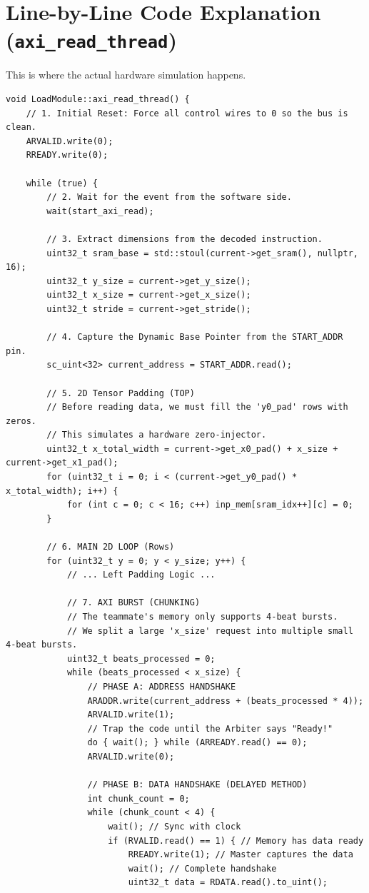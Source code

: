\documentclass[11pt,a4paper]{report}
\begin{document}
\section{Line-by-Line Code Explanation (\texttt{axi\_read\_thread})}
This is where the actual hardware simulation happens.
\begin{lstlisting}
void LoadModule::axi_read_thread() {
    // 1. Initial Reset: Force all control wires to 0 so the bus is clean.
    ARVALID.write(0); 
    RREADY.write(0);

    while (true) {
        // 2. Wait for the event from the software side.
        wait(start_axi_read);

        // 3. Extract dimensions from the decoded instruction.
        uint32_t sram_base = std::stoul(current->get_sram(), nullptr, 16);
        uint32_t y_size = current->get_y_size();
        uint32_t x_size = current->get_x_size();
        uint32_t stride = current->get_stride();

        // 4. Capture the Dynamic Base Pointer from the START_ADDR pin.
        sc_uint<32> current_address = START_ADDR.read(); 

        // 5. 2D Tensor Padding (TOP)
        // Before reading data, we must fill the 'y0_pad' rows with zeros.
        // This simulates a hardware zero-injector.
        uint32_t x_total_width = current->get_x0_pad() + x_size + current->get_x1_pad();
        for (uint32_t i = 0; i < (current->get_y0_pad() * x_total_width); i++) {
            for (int c = 0; c < 16; c++) inp_mem[sram_idx++][c] = 0;
        }

        // 6. MAIN 2D LOOP (Rows)
        for (uint32_t y = 0; y < y_size; y++) {
            // ... Left Padding Logic ...

            // 7. AXI BURST (CHUNKING)
            // The teammate's memory only supports 4-beat bursts. 
            // We split a large 'x_size' request into multiple small 4-beat bursts.
            uint32_t beats_processed = 0;
            while (beats_processed < x_size) {
                // PHASE A: ADDRESS HANDSHAKE
                ARADDR.write(current_address + (beats_processed * 4)); 
                ARVALID.write(1);
                // Trap the code until the Arbiter says "Ready!"
                do { wait(); } while (ARREADY.read() == 0);
                ARVALID.write(0);

                // PHASE B: DATA HANDSHAKE (DELAYED METHOD)
                int chunk_count = 0;
                while (chunk_count < 4) {
                    wait(); // Sync with clock
                    if (RVALID.read() == 1) { // Memory has data ready
                        RREADY.write(1); // Master captures the data
                        wait(); // Complete handshake
                        uint32_t data = RDATA.read().to_uint();
                        

\end{lstlisting}
\end{document}
